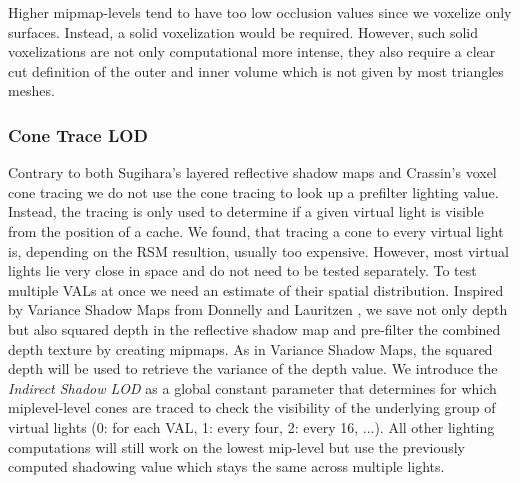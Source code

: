 \documentclass[thesis.tex]{subfiles}
\begin{document}
Higher mipmap-levels tend to have too low occlusion values since we voxelize only surfaces.
Instead, a solid voxelization would be required.
However, such solid voxelizations are not only computational more intense, they also  require a clear cut definition of the outer and inner volume which is not given by most triangles meshes.

\subsubsection{Cone Trace LOD}
Contrary to both Sugihara's layered reflective shadow maps and Crassin's voxel cone tracing we do not use the cone tracing to look up a prefilter lighting value.
Instead, the tracing is only used to determine if a given virtual light is visible from the position of a cache.
We found, that tracing a cone to every virtual light is, depending on the RSM resultion, usually too expensive.
However, most virtual lights lie very close in space and do not need to be tested separately.
To test multiple VALs at once we need an estimate of their spatial distribution.
Inspired by Variance Shadow Maps from Donnelly and Lauritzen \cite{bib:vsm}, we save not only depth but also squared depth in the reflective shadow map and pre-filter the combined depth texture by creating mipmaps.
As in Variance Shadow Maps, the squared depth will be used to retrieve the variance of the depth value.
We introduce the \emph{Indirect Shadow LOD} as a global constant parameter that determines for which miplevel-level cones are traced to check the visibility of the underlying group of virtual lights (0: for each VAL, 1: every four, 2: every 16, ...).
All other lighting computations will still work on the lowest mip-level but use the previously computed shadowing value which stays the same across multiple lights.\\
\end{document}
